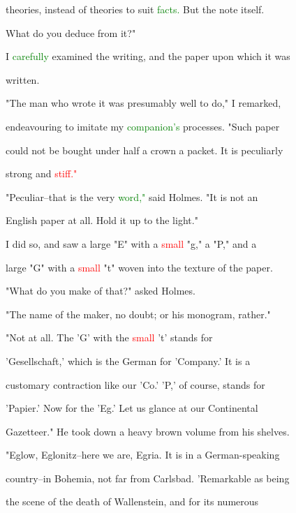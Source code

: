  \textcolor{BurntOrange}{theories,} instead of \textcolor{BurntOrange}{theories} to suit \textcolor{green}{facts.} But the note itself.

 What do you deduce from it?"



 I \textcolor{green}{carefully} examined the writing, and the paper upon which it was

 written.



 "The man who wrote it was presumably well to do," I remarked,

 endeavouring to imitate my \textcolor{green}{companion's} processes. "Such paper

 could not be bought under half a crown a packet. It is peculiarly

 strong and \textcolor{red}{stiff."}



 "Peculiar--that is the very \textcolor{green}{word,"} said Holmes. "It is not an

 English paper at all. Hold it up to the light."



 I did so, and saw a large "E" with a \textcolor{red}{small} "g," a "P," and a

 large "G" with a \textcolor{red}{small} "t" woven into the texture of the paper.



 "What do you make of that?" asked Holmes.



 "The name of the maker, no \textcolor{BurntOrange}{doubt;} or his monogram, rather."



 "Not at all. The 'G' with the \textcolor{red}{small} 't' stands for

 'Gesellschaft,' which is the German for 'Company.' It is a

 customary contraction like our 'Co.' 'P,' of course, stands for

 'Papier.' Now for the 'Eg.' Let us glance at our Continental

 Gazetteer." He took down a heavy brown volume from his shelves.

 "Eglow, Eglonitz--here we are, Egria. It is in a German-speaking

 country--in Bohemia, not far from Carlsbad. \textcolor{BurntOrange}{'Remarkable} as being

 the scene of the \textcolor{BurntOrange}{death} of Wallenstein, and for its numerous

